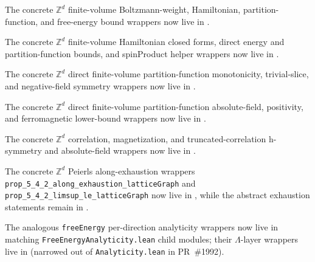 \documentclass[a4paper,11pt]{article}
\begin{document}
{\raggedright
The concrete $\mathbb{Z}^d$ finite-volume Boltzmann-weight, Hamiltonian,
partition-function, and free-energy bound wrappers now live in
.
\par}

{\raggedright
The concrete $\mathbb{Z}^d$ finite-volume Hamiltonian closed forms, direct
energy and partition-function bounds, and spinProduct helper wrappers now live
in
.
\par}

{\raggedright
The concrete $\mathbb{Z}^d$ direct finite-volume partition-function
monotonicity, trivial-slice, and negative-field symmetry wrappers now live in
.
\par}

{\raggedright
The concrete $\mathbb{Z}^d$ direct finite-volume partition-function
absolute-field, positivity, and ferromagnetic lower-bound wrappers now live in
.
\par}

{\raggedright
The concrete $\mathbb{Z}^d$ correlation, magnetization, and
truncated-correlation h-symmetry and absolute-field wrappers now live in
.
\par}

{\raggedright
The concrete $\mathbb{Z}^d$ Peierls along-exhaustion wrappers
\texttt{prop\_5\_4\_2\_along\_exhaustion\_latticeGraph} and
\texttt{prop\_5\_4\_2\_limsup\_le\_latticeGraph} now live in
, while the
abstract exhaustion statements remain in .
\par}

The analogous \texttt{freeEnergy} per-direction analyticity wrappers
now live in matching \texttt{FreeEnergyAnalyticity.lean} child modules;
their $\Lambda$-layer wrappers live in
(narrowed out of \texttt{Analyticity.lean} in PR~\#1992).
\end{document}

